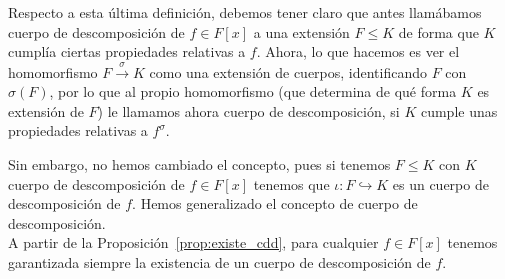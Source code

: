 \noindent
Respecto a esta última definición, debemos tener claro que antes llamábamos cuerpo de descomposición de $f\in F[x]$ a una extensión $F\leq K$ de forma que $K$ cumplía ciertas propiedades relativas a $f$. Ahora, lo que hacemos es ver el homomorfismo $F\stackrel{\sigma}{\to} K$ como una extensión de cuerpos, identificando $F$ con $\sigma(F)$, por lo que al propio homomorfismo (que determina de qué forma $K$ es extensión de $F$) le llamamos ahora cuerpo de descomposición, si $K$ cumple unas propiedades relativas a $f^\sigma$.

\noindent
Sin embargo, no hemos cambiado el concepto, pues si tenemos $F\leq K$ con $K$ cuerpo de descomposición de $f\in F[x]$ tenemos que $\iota:F\hookrightarrow K$ es un cuerpo de descomposición de $f$. Hemos generalizado el concepto de cuerpo de descomposición.\\

\noindent
A partir de la Proposición~\ref{prop:existe_cdd}, para cualquier $f\in F[x]$ tenemos garantizada siempre la existencia de un cuerpo de descomposición de $f$.

